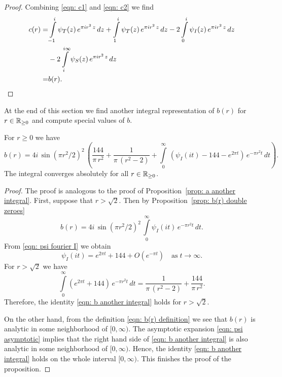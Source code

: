 \begin{proof}
  Combining \eqref{eqn: c1} and \eqref{eqn: c2} we find
  \begin{align}c(r)=&\int\limits_{-1}^{i}\psi_T(z)\,e^{\pi i r^2 \,z}\,dz+\int\limits_{1}^{i}\psi_T(z)\,e^{\pi i r^2 \,z}\,dz
  -2\int\limits_{0}^{i}\psi_I(z)\,e^{\pi i r^2 \,z}\,dz\notag\\
  &-2\int\limits_{i}^{i\infty}\psi_S(z)\,e^{\pi i r^2 \,z}\,dz\notag\\
  =&b(r).\notag
   \end{align}
  \end{proof}
  At the end of this section we find another integral representation of $b(r)$ for $r\in\mathbb{R}_{\geq0}$ and compute special values of $b$.
  \begin{proposition}\label{prop: b another integral}
  For $r\geq0$ we have
  \begin{equation}\label{eqn: b another integral}b(r)=4i\,\sin(\pi r^2/2)^2\,\left(\frac{144}{\pi\,r^2}+\frac{1}{\pi\,(r^2-2)}+\int\limits_0^\infty\,\left(\psi_I(it)-144-e^{2\pi t}\right)\,e^{-\pi r^2 t}\,dt\right).\end{equation}
  The integral converges absolutely for all $r\in\mathbb{R}_{\geq 0}$.
  \end{proposition}
  \begin{proof}
  The proof is analogous to the proof of Proposition~\ref{prop: a another integral}.
  First, suppose that $r>\sqrt{2}$. Then by Proposition~\ref{prop: b(r) double zeroes}
  $$b(r)=4i\,\sin(\pi r^2/2)^2\,\int\limits_{0}^{\infty}\psi_I(it)\,e^{-\pi r^2 t}\,dt. $$
  From \eqref{eqn: psi fourier I} we obtain
  \begin{equation}\label{eqn: psi asymptotic}
  \psi_I(it)=e^{2\pi t}+144+O(e^{-\pi t})\quad\mbox{as}\;t\to\infty.
  \end{equation}
  For $r>\sqrt{2}$ we have
  \begin{equation}
  \int\limits_0^\infty \left(e^{2\pi t}+144\right)\,e^{-\pi r^2 t}\,dt
  =\frac{1}{\pi\,(r^2-2)}+\frac{144}{\pi\,r^2}.\end{equation}
  Therefore, the identity \eqref{eqn: b another integral} holds for $r>\sqrt{2}$.

  On the other hand, from the definition \eqref{eqn: b(r) definition} we see that $b(r)$ is analytic in some neighborhood of $[0,\infty)$. The asymptotic expansion \eqref{eqn: psi asymptotic} implies that the right hand side of \eqref{eqn: b another integral} is also analytic in some neighborhood of $[0,\infty)$. Hence, the identity \eqref{eqn: b another integral} holds on the whole interval $[0,\infty)$. This finishes the proof of the proposition.
  \end{proof}
